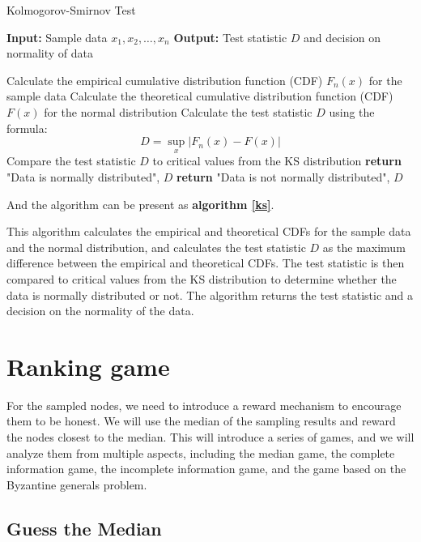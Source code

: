 \documentclass[twocolumn]{article}
\begin{document}
\begin{algorithm}[htbp]
\caption{Kolmogorov-Smirnov Test}
\begin{algorithmic}[1]
\State \textbf{Input:} Sample data $x_1, x_2, \dots, x_n$
\State \textbf{Output:} Test statistic $D$ and decision on normality of data

\State Calculate the empirical cumulative distribution function (CDF) $F_{n}(x)$ for the sample data
\State Calculate the theoretical cumulative distribution function (CDF) $F(x)$ for the normal distribution
\State Calculate the test statistic $D$ using the formula:
\begin{equation}
D = \sup_{x} \left| F_{n}(x) - F(x) \right|
\end{equation}
\State Compare the test statistic $D$ to critical values from the KS distribution
\State \textbf{return} "Data is normally distributed", $D$
\Else
\State \textbf{return} "Data is not normally distributed", $D$
\EndIf
\end{algorithmic}
\label{ks}
\end{algorithm}

And the algorithm can be present as \textbf{algorithm \ref{ks}}.

This algorithm calculates the empirical and theoretical CDFs for the sample data and the normal distribution, and calculates the test statistic $D$ as the maximum difference between the empirical and theoretical CDFs. The test statistic is then compared to critical values from the KS distribution to determine whether the data is normally distributed or not. The algorithm returns the test statistic and a decision on the normality of the data.


\section{Ranking game}


For the sampled nodes, we need to introduce a reward mechanism to encourage them to be honest. We will use the median of the sampling results and reward the nodes closest to the median. This will introduce a series of games, and we will analyze them from multiple aspects, including the median game, the complete information game, the incomplete information game, and the game based on the Byzantine generals problem.

\subsection{Guess the Median}
\end{document}
